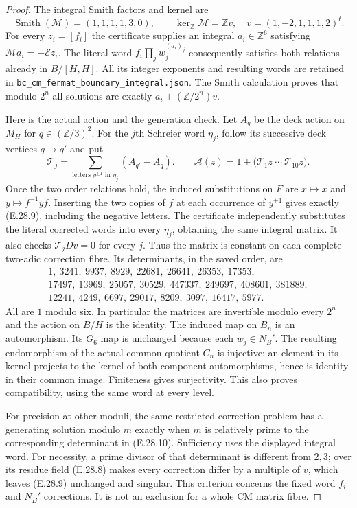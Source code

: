 \begin{proof}
The integral Smith factors and kernel are
\[
 \operatorname{Smith}(\mathcal M)=(1,1,1,1,3,0),\qquad
 \ker_{\mathbb Z}\mathcal M=\mathbb Z v,\quad
 v=(1,-2,1,1,1,2)^t .
 \tag{E.28.8}
\]
For every $z_i=[f_i]$ the certificate supplies an integral
$a_i\in\mathbb Z^6$ satisfying
$\mathcal M a_i=-\mathcal E z_i$.
The literal word $f_i\prod_j w_j^{(a_i)_j}$ consequently
satisfies both relations already in $B/[H,H]$.
All its integer exponents and resulting words are retained in
\texttt{bc\_cm\_fermat\_boundary\_integral.json}.
The Smith calculation proves that modulo $2^n$ all solutions
are exactly $a_i+(\mathbb Z/2^n)v$.

Here is the actual action and the generation check.  Let $A_q$
be the deck action on $M_H$ for $q\in(\mathbb Z/3)^2$.
For the $j$th Schreier word $\eta_j$, follow its successive
deck vertices $q\to q'$ and put
\[
 \mathcal T_j=\sum_{\text{letters }y^{\pm1}\text{ in }\eta_j}
                         (A_{q'}-A_q).
 \qquad
 \mathcal A(z)=1+
       \bigl(\mathcal T_1z\ \cdots\ \mathcal T_{10}z\bigr).
 \tag{E.28.9}
\]
Once the two order relations hold, the induced substitutions
on $F$ are $x\mapsto x$ and $y\mapsto f^{-1}yf$.
Inserting the two copies of $f$ at each occurrence of
$y^{\pm1}$ gives exactly (E.28.9), including the negative
letters.  The certificate independently substitutes the
literal corrected words into every $\eta_j$, obtaining the
same integral matrix.  It also checks
$\mathcal T_jDv=0$ for every $j$.
Thus the matrix is constant on each complete two-adic
correction fibre.  Its determinants, in the saved order, are
\[
 \begin{gathered}
 1,\ 3241,\ 9937,\ 8929,\ 22681,\ 26641,\ 26353,\ 17353,\\
 17497,\ 13969,\ 25057,\ 30529,\ 447337,\ 249697,\ 408601,\ 381889,\\
 12241,\ 4249,\ 6697,\ 29017,\ 8209,\ 3097,\ 16417,\ 5977 .
 \end{gathered}
 \tag{E.28.10}
\]
All are $1$ modulo six.  In particular the matrices are
invertible modulo every $2^n$ and the action on $B/H$ is
the identity.  The induced map on $B_n$ is an automorphism.
Its $G_6$ map is unchanged because each $w_j\in N_B'$.
The resulting endomorphism of the actual common quotient
$C_n$ is injective: an element in its kernel projects to
the kernel of both component automorphisms, hence is
identity in their common image.  Finiteness gives
surjectivity.  This also proves compatibility, using the
same word at every level.

For precision at other moduli, the same restricted correction
problem has a generating solution modulo $m$ exactly when
$m$ is relatively prime to the corresponding determinant
in (E.28.10).  Sufficiency uses the displayed integral word.
For necessity, a prime divisor of that determinant is
different from $2,3$; over its residue field (E.28.8) makes
every correction differ by a multiple of $v$, which leaves
(E.28.9) unchanged and singular.  This criterion concerns
the fixed word $f_i$ and $N_B'$ corrections.  It is not an
exclusion for a whole CM matrix fibre.


\end{proof}
